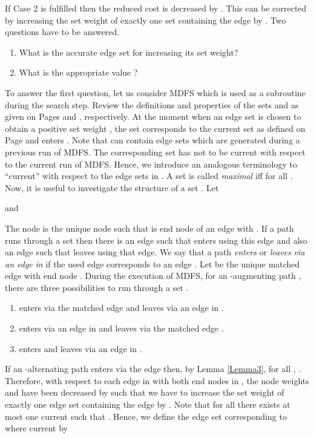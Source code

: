 \documentclass[12pt,twoside,a4paper]{article}
\begin{document}
If Case 2 is fulfilled then the reduced cost  is decreased by 
. This can be corrected by increasing the set weight  of
exactly one set  containing the edge  by .
Two questions have to be answered.
\begin{enumerate}
\item
What is the accurate edge set  for increasing its set weight?
\item
What is the appropriate value ?
\end{enumerate}
To answer the first question, let us consider MDFS which is used as a subroutine 
during the search step. 
Review the definitions and properties of the sets  and  as given 
on Pages \pageref{WM1} and \pageref{WM2}, respectively. At the moment when an edge set  
is chosen to obtain a positive set weight , the set  corresponds to the 
current set  as defined on Page \pageref{WM2} and  enters .
Note that  can contain edge sets which are generated during a previous run
of MDFS. The corresponding set  has not to be current with respect to the
current run of MDFS. Hence, we introduce an analogous terminology to ``current'' with
respect to the edge sets in .
A set  is called {\em maximal\/} iff  for all
.
Now, it is useful to investigate the structure of a set . Let

and

The node  is the unique node  such that  is end node of an
edge  with . 
If a path  runs through a set  then there is an edge such
that  enters  using this edge and also an edge such that  
leaves  using that edge. 
We say that a path  {\em enters\/} or {\em leaves\/}  
{\em via an edge\/} {\em in\/}  if the used edge  
corresponds to an edge .
Let  be the unique matched edge with end node . 
During the execution of MDFS, for an -augmenting path , there are three 
possibilities to run through a set .
\begin{enumerate}
\item
 enters  via the matched edge  and leaves
 via an edge in .
\item
 enters  via an edge in  and leaves 
 via the matched edge .
\item
 enters and leaves  via an edge in .
\end{enumerate}
If an -alternating path  enters  via the edge 
 then, by Lemma \ref{Lemma3}, for all , 
. Therefore, with respect to each edge  
in  with both end nodes in , the node weights  and
 have been decreased by  such that we have to increase the set
weight of exactly one edge set containing the edge  by .
Note that for all  there exists at most one current 
such that . Hence, we define the edge set  
corresponding to  where  current by
\end{document}
